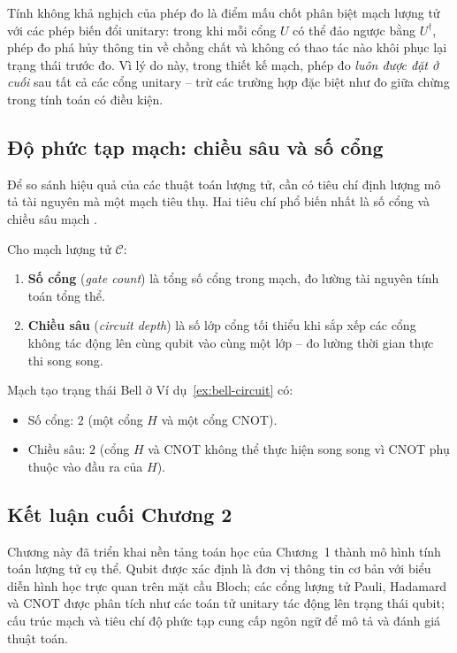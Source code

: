 \begin{remark}
Tính không khả nghịch của phép đo là điểm mấu chốt phân biệt mạch lượng tử với
các phép biến đổi unitary: trong khi mỗi cổng $U$ có thể đảo ngược bằng $U^\dagger$,
phép đo phá hủy thông tin về chồng chất và không có thao tác nào khôi phục lại
trạng thái trước đo. Vì lý do này, trong thiết kế mạch, phép đo \emph{luôn được
đặt ở cuối} sau tất cả các cổng unitary -- trừ các trường hợp đặc biệt như đo
giữa chừng trong tính toán có điều kiện.
\end{remark}


\subsection*{Độ phức tạp mạch: chiều sâu và số cổng}

Để so sánh hiệu quả của các thuật toán lượng tử, cần có tiêu chí định lượng mô
tả tài nguyên mà một mạch tiêu thụ. Hai tiêu chí phổ biến nhất là số cổng và
chiều sâu mạch \cite{ref5}.

\begin{definition}
\label{def:complexity}
Cho mạch lượng tử $\mathcal{C}$:
\begin{enumerate}[label=(\roman*)]
    \item \textbf{Số cổng} (\textit{gate count}) là tổng số cổng trong mạch,
          đo lường tài nguyên tính toán tổng thể.
    \item \textbf{Chiều sâu} (\textit{circuit depth}) là số lớp cổng tối thiểu
          khi sắp xếp các cổng không tác động lên cùng qubit vào cùng một lớp --
          đo lường thời gian thực thi song song.
\end{enumerate}
\end{definition}

\begin{example}
\label{ex:bell-complexity}
Mạch tạo trạng thái Bell ở Ví dụ~\ref{ex:bell-circuit} có:
\begin{itemize}
    \item Số cổng: $2$ (một cổng $H$ và một cổng CNOT).
    \item Chiều sâu: $2$ (cổng $H$ và CNOT không thể thực hiện song song vì
          CNOT phụ thuộc vào đầu ra của $H$).
\end{itemize}
\end{example}

\subsection*{Kết luận cuối Chương 2}
Chương này đã triển khai nền tảng toán học của Chương~1 thành mô hình
tính toán lượng tử cụ thể. Qubit được xác định là đơn vị thông tin cơ bản
với biểu diễn hình học trực quan trên mặt cầu Bloch; các cổng lượng tử
Pauli, Hadamard và CNOT được phân tích như các toán tử unitary tác động
lên trạng thái qubit; cấu trúc mạch và tiêu chí độ phức tạp cung cấp
ngôn ngữ để mô tả và đánh giá thuật toán.